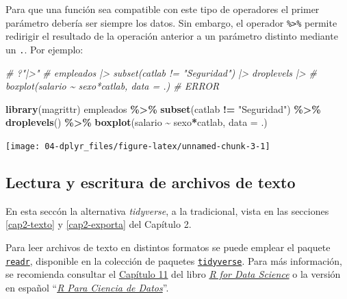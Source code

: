 \documentclass[
]{book}
\newenvironment{Shaded}{\begin{snugshade}}{\end{snugshade}}
\newcommand{\AttributeTok}[1]{\textcolor[rgb]{0.13,0.29,0.53}{#1}}
\newcommand{\CommentTok}[1]{\textcolor[rgb]{0.56,0.35,0.01}{\textit{#1}}}
\newcommand{\FunctionTok}[1]{\textcolor[rgb]{0.13,0.29,0.53}{\textbf{#1}}}
\newcommand{\NormalTok}[1]{#1}
\newcommand{\SpecialCharTok}[1]{\textcolor[rgb]{0.81,0.36,0.00}{\textbf{#1}}}
\newcommand{\StringTok}[1]{\textcolor[rgb]{0.31,0.60,0.02}{#1}}
\begin{document}
Para que una función sea compatible con este tipo de operadores el primer parámetro debería ser siempre los datos.
Sin embargo, el operador \texttt{\%\textgreater{}\%} permite redirigir el resultado de la operación anterior a un parámetro distinto mediante un \texttt{.}.
Por ejemplo:

\begin{Shaded}
\begin{Highlighting}[]
\CommentTok{\# ?"|\textgreater{}"}
\CommentTok{\# empleados |\textgreater{} subset(catlab != "Seguridad") |\textgreater{} droplevels |\textgreater{} }
\CommentTok{\#     boxplot(salario \textasciitilde{} sexo*catlab, data = .) \# ERROR}

\FunctionTok{library}\NormalTok{(magrittr)}
\NormalTok{empleados }\SpecialCharTok{\%\textgreater{}\%} 
  \FunctionTok{subset}\NormalTok{(catlab }\SpecialCharTok{!=} \StringTok{"Seguridad"}\NormalTok{) }\SpecialCharTok{\%\textgreater{}\%}
  \FunctionTok{droplevels}\NormalTok{() }\SpecialCharTok{\%\textgreater{}\%}
  \FunctionTok{boxplot}\NormalTok{(salario }\SpecialCharTok{\textasciitilde{}}\NormalTok{ sexo}\SpecialCharTok{*}\NormalTok{catlab, }\AttributeTok{data =}\NormalTok{ .)}
\end{Highlighting}
\end{Shaded}

\begin{center}\texttt{[image: 04-dplyr\_files/figure-latex/unnamed-chunk-3-1]} \end{center}

\hypertarget{readr}{%
\subsection{Lectura y escritura de archivos de texto}\label{readr}}

En esta seccón la alternativa \emph{tidyverse}, a la tradicional, vista en las secciones \ref{cap2-texto} y \ref{cap2-exporta} del Capítulo 2.

Para leer archivos de texto en distintos formatos se puede emplear el paquete \href{https://readr.tidyverse.org}{\texttt{readr}}, disponible en la colección de paquetes \href{https://tidyverse.tidyverse.org}{\texttt{tidyverse}}. Para más información, se recomienda consultar el \href{https://r4ds.had.co.nz/data-import.html}{Capítulo 11} del libro \href{http://r4ds.had.co.nz}{\emph{R for Data Science}} \citep{wickham2023r} o la versión en español ``\href{https://es.r4ds.hadley.nz/}{\emph{R Para Ciencia de Datos}}''.
\end{document}
